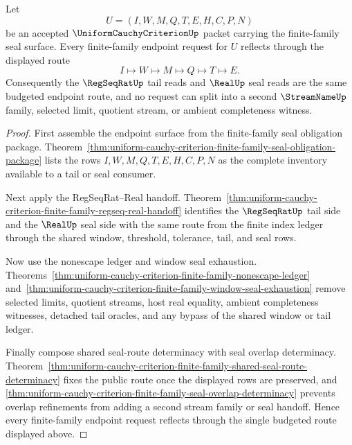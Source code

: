 \begin{theorem}
\label{thm:uniform-cauchy-criterion-finite-family-endpoint-budget-reflector}
Let
$$
U=(I,W,M,Q,T,E,H,C,P,N)
$$
be an accepted $\UniformCauchyCriterionUp$ packet carrying the finite-family seal surface. Every finite-family endpoint request for $U$ reflects through the displayed route
$$
I \longmapsto W \longmapsto M \longmapsto Q \longmapsto T \longmapsto E.
$$
Consequently the $\RegSeqRatUp$ tail reads and $\RealUp$ seal reads are the same budgeted endpoint route, and no request can split into a second $\StreamNameUp$ family, selected limit, quotient stream, or ambient completeness witness.
\end{theorem}
\begin{proof}
First assemble the endpoint surface from the finite-family seal obligation package. Theorem~\ref{thm:uniform-cauchy-criterion-finite-family-seal-obligation-package} lists the rows $I,W,M,Q,T,E,H,C,P,N$ as the complete inventory available to a tail or seal consumer.

Next apply the RegSeqRat--Real handoff. Theorem~\ref{thm:uniform-cauchy-criterion-finite-family-regseq-real-handoff} identifies the $\RegSeqRatUp$ tail side and the $\RealUp$ seal side with the same route from the finite index ledger through the shared window, threshold, tolerance, tail, and seal rows.

Now use the nonescape ledger and window seal exhaustion. Theorems~\ref{thm:uniform-cauchy-criterion-finite-family-nonescape-ledger} and~\ref{thm:uniform-cauchy-criterion-finite-family-window-seal-exhaustion} remove selected limits, quotient streams, host real equality, ambient completeness witnesses, detached tail oracles, and any bypass of the shared window or tail ledger.

Finally compose shared seal-route determinacy with seal overlap determinacy. Theorem~\ref{thm:uniform-cauchy-criterion-finite-family-shared-seal-route-determinacy} fixes the public route once the displayed rows are preserved, and \autoref{thm:uniform-cauchy-criterion-finite-family-seal-overlap-determinacy} prevents overlap refinements from adding a second stream family or seal handoff. Hence every finite-family endpoint request reflects through the single budgeted route displayed above.
\end{proof}

